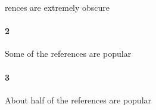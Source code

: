 rences are extremely obscure\paragraph{2}Some of the references are popular\paragraph{3}About half of the references are popular\paragra